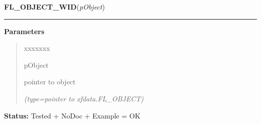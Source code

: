 \hspace{.8\funcindent}\begin{boxedminipage}{\funcwidth}

    \raggedright \textbf{FL\_OBJECT\_WID}(\textit{pObject})

    \vspace{-1.5ex}

    \rule{\textwidth}{0.5\fboxrule}
\setlength{\parskip}{2ex}
\setlength{\parskip}{1ex}
      \textbf{Parameters}
      \vspace{-1ex}

      \begin{quote}
        \begin{Ventry}{xxxxxxx}

          \item[pObject]

          pointer to object

            {\it (type=pointer to xfdata.FL\_OBJECT)}

        \end{Ventry}

      \end{quote}

\textbf{Status:} Tested + NoDoc + Example = OK



    \end{boxedminipage}

    \label{xformslib:library:fl_XNextEvent}

    \vspace{0.5ex}

